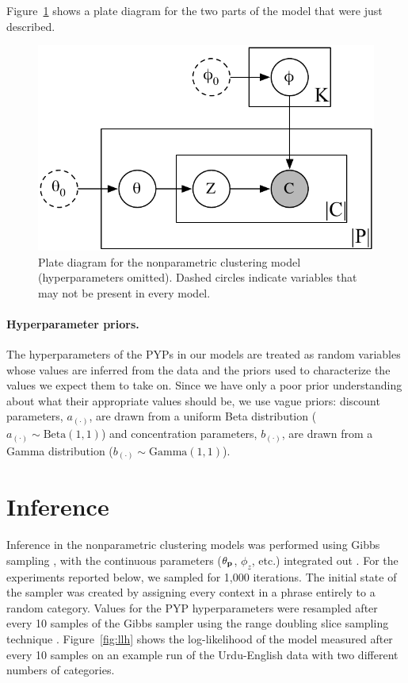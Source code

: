 \noindent Figure~\ref{fig:np_plate} shows a plate diagram for the two parts of the model that were just described.

\begin{figure}
\begin{center}
\includegraphics[scale=0.75]{pyp_clustering/np_plate.pdf}
\vspace{-0.3cm}
\end{center}
\caption{Plate diagram for the nonparametric clustering model (hyperparameters omitted).  Dashed circles indicate variables that may not be present in every model.}
\label{fig:np_plate}
\end{figure}

\paragraph{Hyperparameter priors.} The hyperparameters of the PYPs in our models are treated as random variables whose values are inferred from the data and the priors used to characterize the values we expect them to take on.  Since we have only a poor prior understanding about what their appropriate values should be, we use vague priors: discount parameters, $a_{(\cdot)}$, are drawn from a uniform Beta distribution ($a_{(\cdot)} \sim \textrm{Beta}(1,1)$) and concentration parameters, $b_{(\cdot)}$, are drawn from a Gamma distribution ($b_{(\cdot)} \sim \textrm{Gamma}(1,1)$).

\section{Inference}

Inference in the nonparametric clustering models was performed using Gibbs sampling \citep{geman:1984}, with the continuous parameters ($\theta_{\textbf{p}}$, $\phi_z$, etc.) integrated out \citep{blunsom:2009}.  For the experiments reported below, we sampled for 1,000 iterations.  The initial state of the sampler was created by assigning every context in a phrase entirely to a random category. Values for the PYP hyperparameters were resampled after every 10 samples of the Gibbs sampler using the range doubling slice sampling technique \citep{neal:2000,johnson:2009}. Figure~\ref{fig:llh} shows the log-likelihood of the model measured after every 10 samples on an example run of the Urdu-English data with two different numbers of categories.

